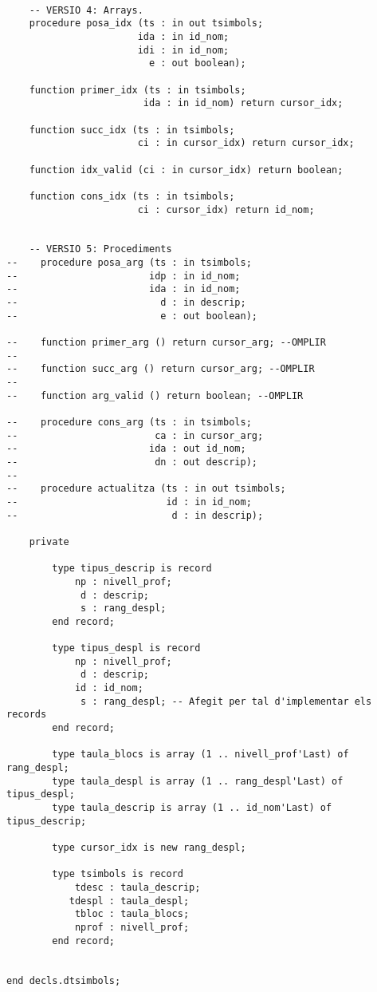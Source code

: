 \documentclass[10pt]{report}
\begin{document}
\begin{lstlisting}[style=Ada]
                       
    -- VERSIO 4: Arrays.
    procedure posa_idx (ts : in out tsimbols;
                       ida : in id_nom;
                       idi : in id_nom;
                         e : out boolean);
                        
    function primer_idx (ts : in tsimbols;
                        ida : in id_nom) return cursor_idx;
                         
    function succ_idx (ts : in tsimbols;
                       ci : in cursor_idx) return cursor_idx;
                             
    function idx_valid (ci : in cursor_idx) return boolean;
    
    function cons_idx (ts : in tsimbols;
                       ci : cursor_idx) return id_nom;
                         
                         
    -- VERSIO 5: Procediments
--    procedure posa_arg (ts : in tsimbols;
--                       idp : in id_nom;
--                       ida : in id_nom;
--                         d : in descrip;
--                         e : out boolean);
                          
--    function primer_arg () return cursor_arg; --OMPLIR
--    
--    function succ_arg () return cursor_arg; --OMPLIR
--    
--    function arg_valid () return boolean; --OMPLIR
    
--    procedure cons_arg (ts : in tsimbols;
--                        ca : in cursor_arg;
--                       ida : out id_nom;
--                        dn : out descrip);
--                         
--    procedure actualitza (ts : in out tsimbols;
--                          id : in id_nom;
--                           d : in descrip);
    
    private
    
        type tipus_descrip is record
            np : nivell_prof;
             d : descrip;
             s : rang_despl;
        end record;
        
        type tipus_despl is record
            np : nivell_prof;
             d : descrip;
            id : id_nom;
             s : rang_despl; -- Afegit per tal d'implementar els records
        end record;
         
        type taula_blocs is array (1 .. nivell_prof'Last) of rang_despl;
        type taula_despl is array (1 .. rang_despl'Last) of tipus_despl;
        type taula_descrip is array (1 .. id_nom'Last) of tipus_descrip;
        
        type cursor_idx is new rang_despl;
            
        type tsimbols is record
            tdesc : taula_descrip;
           tdespl : taula_despl;
            tbloc : taula_blocs;
            nprof : nivell_prof;
        end record;
        

end decls.dtsimbols;
    \end{lstlisting}
    \newpage
    
\end{document}
